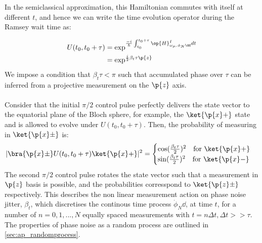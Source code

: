 In the semiclassical approximation, this Hamiltonian commutes with itself at different $t$, and hence we can write the time evolution operator during the Ramsey wait time as:

\begin{align}
U(t_0, t_0 + \tau) & = \exp^{\frac{-i}{\hbar} \int_{t_0}^{t_0 + \tau} \op{H}^{I}_{\omega_\mu,\phi_N\dd} dt} \\
& = \exp^{\frac{i}{2} \beta_t \tau \p{z}}
\end{align}
We impose a condition that $\beta_t \tau < \pi$ such that accumulated phase over $\tau$ can be inferred from a projective measurement on the $\p{z}$ axis. 
\\
\\
Consider that the initial $\pi/2$ control pulse perfectly delivers the state vector to the equatorial plane of the Bloch sphere, for example, the  $\ket{\p{x} +}$ state and is allowed to evolve under $U(t_0, t_0 + \tau)$. Then, the probability of measuring in $\ket{\p{x} \pm}$ is:
\begin{align}
|\bra{\p{x} \pm} U(t_0, t_0 + \tau) \ket{\p{x} +}|^2= \begin{cases} \cos(\frac{\beta_t \tau}{2})^2 \quad \text{for $ \ket{\p{x} +}$} \\   \sin(\frac{\beta_t \tau}{2})^2  \quad \text{for $ \ket{\p{x} -}$} \end{cases}
\end{align}
The second $\pi/2$ control pulse rotates the state vector such that a measurement in $\p{z}$ basis is possible, and the probabilities corresspond to $\ket{\p{z} \pm}$
respectively. This describes the non linear measurement action on phase noise jitter, $\beta_t$, which discretises the continous time process $\dot{\phi}_N\dd$, at time $t$, for a number of $n= 0, 1, ..., N$ equally spaced measurements with $t = n \Delta t, \Delta t >> \tau$.  The properties of phase noise as a random process are outlined in \cref{sec:ap_randomprocess}.

